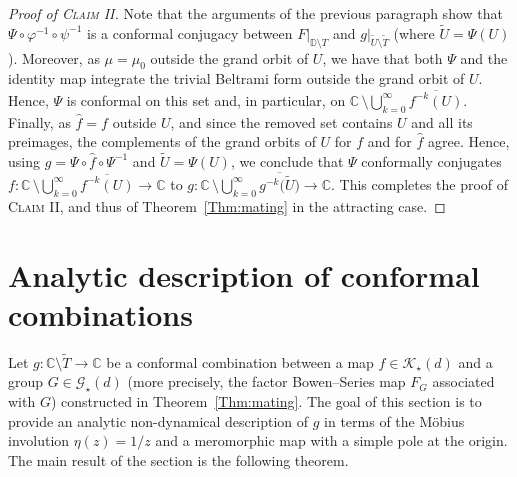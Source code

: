 \documentclass[11pt,a4paper, oneside]{amsart}
\theoremstyle{definition}
\theoremstyle{remark}
\numberwithin{equation}{section}
\def\D{{\mathbb{D}}}
\renewcommand{\hat}{\widehat}
\newcommand{\Kstar}{{\mathscr K_\star}}
\newcommand{\Gstar}{\mathscr G_\star}
\newcommand{\ovl}{\overline}
\newcommand{\C}{\mathbb{C}}
\newcommand{\sm}{\setminus}
\renewcommand{\tilde}{\widetilde}
\renewcommand{\phi}{\varphi}
\begin{document}
\begin{proof}[Proof of \textsc{Claim II}]
Note that the arguments of the previous paragraph show that $\Psi\circ\phi^{-1}\circ\psi^{-1}$ is a conformal conjugacy between $F\vert_{\D\setminus T}$ and $g\vert_{\widetilde{U}\setminus\widetilde{T}}$ (where $\tilde U=\Psi(U)$). Moreover, as $\mu=\mu_0$ outside the grand orbit of $U$, we have that both $\Psi$ and the identity map integrate the trivial Beltrami form outside the grand orbit of $U$. Hence, $\Psi$ is conformal on this set {and, in particular, on $\C \,\sm \bigcup_{k=0}^\infty \ovl{f^{-k}(U)}.$}
Finally, as $\hat f=f$ outside $U$, {and since the removed set contains $U$ and all its preimages, the complements of the grand orbits of $U$ for $f$ and for $\hat f$ agree. Hence, using $g=\Psi\circ\hat f\circ\Psi^{-1}$ and $\tilde U=\Psi(U)$,} we conclude that $\Psi$ conformally conjugates $f \colon \C \,\sm \bigcup_{k=0}^\infty \ovl{f^{-k}(U)} \to \C$ to $g \colon \C \,\sm \bigcup_{k=0}^\infty \ovl{g^{-k}\big(\tilde U\big)} \to \C$. This completes the proof of \textsc{Claim II}, and thus of Theorem~\ref{Thm:mating} in the attracting case.
\end{proof}
\section{Analytic description of conformal combinations}\label{analytic_description_sec}

Let $g:\C\setminus\widetilde{T}\to\C$ be a conformal combination between a map $f\in\Kstar(d)$ and a group $G\in\Gstar(d)$ (more precisely, the factor Bowen--Series map $F_G$ associated with $G$) constructed in Theorem~\ref{Thm:mating}.
The goal of this section is to provide an analytic non-dynamical description of $g$ in terms of the M{\"o}bius involution $\eta(z)=1/z$ and a meromorphic map with a simple pole at the origin. The main result of the section is the following theorem.
\end{document}

